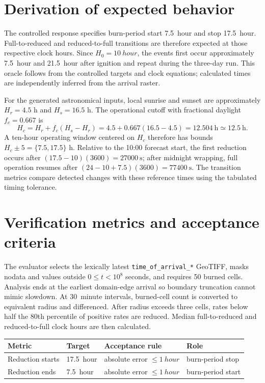 \section{Derivation of expected behavior}

The controlled response specifies burn-period start \SI{7.5}{hour} and stop \SI{17.5}{hour}. Full-to-reduced and reduced-to-full transitions are therefore expected at those respective clock hours. Since $H_0=\SI{10}{hour}$, the events first occur approximately \SI{7.5}{hour} and \SI{21.5}{hour} after ignition and repeat during the three-day run. This oracle follows from the controlled targets and clock equations; calculated times are independently inferred from the arrival raster.

For the generated astronomical inputs, local sunrise and sunset are
approximately \(H_r=4.5\) h and \(H_s=16.5\) h.  The operational cutoff
with fractional daylight \(f_c=0.667\) is
\[
 H_c=H_r+f_c(H_s-H_r)=4.5+0.667(16.5-4.5)
 =12.504~\mathrm{h}\simeq12.5~\mathrm{h}.
\]
A ten-hour operating window centered on \(H_c\) therefore has bounds
\(H_c\pm5=\{7.5,17.5\}\) h.  Relative to the 10:00 forecast start, the
first reduction occurs after
\((17.5-10)(3600)=27000~\mathrm{s}\); after midnight wrapping, full
operation resumes after \((24-10+7.5)(3600)=77400~\mathrm{s}\).
The transition metrics compare detected changes with these reference
times using the tabulated timing tolerance.

\section{Verification metrics and acceptance criteria}

The evaluator selects the lexically latest \texttt{time\_of\_arrival\_*} GeoTIFF, masks nodata and values outside $0\le t<10^{8}$ seconds, and requires 50 burned cells. Analysis ends at the earliest domain-edge arrival so boundary truncation cannot mimic slowdown. At \SI{30}{minute} intervals, burned-cell count is converted to equivalent radius and differenced. After radius exceeds three cells, rates below half the 80th percentile of positive rates are reduced. Median full-to-reduced and reduced-to-full clock hours are then calculated.

\begin{center}\begin{tabular}{@{}llll@{}}
\toprule Metric & Target & Acceptance rule & Role \\
\midrule
Reduction starts & \SI{17.5}{hour} & absolute error $\le\SI{1}{hour}$ & burn-period stop \\
Reduction ends & \SI{7.5}{hour} & absolute error $\le\SI{1}{hour}$ & burn-period start \\
\bottomrule\end{tabular}\end{center}

